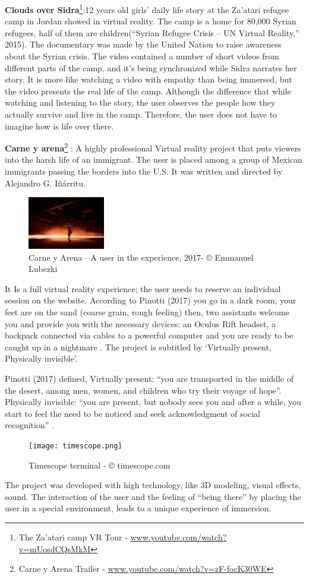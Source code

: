 \textbf{Clouds over Sidra}\footnote{The Za’atari camp VR Tour - \url{www.youtube.com/watch?v=mUosdCQsMkM}}:12 years old girls’ daily life story at the Za’atari refugee camp in Jordan
showed in virtual reality. The camp is a home for 80,000 Syrian refugees, half of them are children(“Syrian Refugee Crisis – UN Virtual Reality,” 2015). The documentary was made by the United Nation to raise awareness about the Syrian crisis. The video contained a number of short videos from different parts of the camp, and it’s being synchronized while Sidra narrates her story.
It is more like watching a video with empathy than being immersed, but
the video presents the real life of the camp. Although the difference that while watching and
listening to the story, the user observes the people how they actually survive and live in the
camp. Therefore, the user does not have to imagine how is life over there.



\textbf{Carne y arena}\footnote{Carne y Arena Trailer - \url{www.youtube.com/watch?v=zF-focK30WE}} : A highly professional
Virtual reality project that puts viewers
into the harsh life of an immigrant. The
user is placed among a group of
Mexican immigrants passing the
borders into the U.S. It was written and
directed by Alejandro G. Iñárritu. 
\begin{figure}
    \centering
    \includegraphics[width=0.30\textwidth]{images/carne.png}
    \caption{Carne y Arena—A user in the experience, 2017- © Emmanuel Lubezki}
    \label{fig:carne}
\end{figure}
It Is a full virtual reality experience; the user
needs to reserve an individual session
on the website. According to Pinotti (2017) you go in a dark room; your feet are on the sand (coarse grain, rough feeling) then, two assistants welcome you and provide you with the
necessary devices: an Oculus Rift headset, a backpack connected via cables to a powerful
computer and you are ready to be caught up in a nightmare \citep{Pinotti2017}. The project is
subtitled by ‘Virtually present, Physically invisible’. 


Pinotti (2017) defined, Virtually present:
“you are transported in the middle of the desert, among men, women, and children who try
their voyage of hope”. Physically invisible: “you are present, but nobody sees you and after a
while, you start to feel the need to be noticed and seek acknowledgment of social
recognition” \citep{Pinotti2017}. 
\begin{figure}
    \centering
    \texttt{[image: timescope.png]}
    \caption{Timescope terminal - © timescope.com }
    \label{fig:timescope}
\end{figure}
The project was developed with high technology, like 3D
modeling, visual effects, sound. The interaction of the user and the feeling of “being there”
by placing the user in a special environment, leads to a unique experience of immersion.

